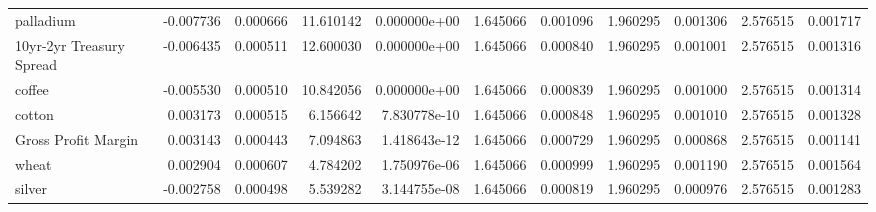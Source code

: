\documentclass[12pt,a4paper,english]{article}
\begin{document}
{{\begin{tabular}{@{}lrrrrrrrrrr@{}}
			palladium                     & -0.007736                & 0.000666                    & 11.610142                 & 0.000000e+00                             & 1.645066                      & 0.001096                      & 1.960295                     & 0.001306                     & 2.576515                     & 0.001717                     \\
			10yr-2yr Treasury Spread      & -0.006435                & 0.000511                    & 12.600030                 & 0.000000e+00                             & 1.645066                      & 0.000840                      & 1.960295                     & 0.001001                     & 2.576515                     & 0.001316                     \\
			coffee                        & -0.005530                & 0.000510                    & 10.842056                 & 0.000000e+00                             & 1.645066                      & 0.000839                      & 1.960295                     & 0.001000                     & 2.576515                     & 0.001314                     \\
			cotton                        & 0.003173                 & 0.000515                    & 6.156642                  & 7.830778e-10                             & 1.645066                      & 0.000848                      & 1.960295                     & 0.001010                     & 2.576515                     & 0.001328                     \\
			Gross Profit Margin           & 0.003143                 & 0.000443                    & 7.094863                  & 1.418643e-12                             & 1.645066                      & 0.000729                      & 1.960295                     & 0.000868                     & 2.576515                     & 0.001141                     \\
			wheat                         & 0.002904                 & 0.000607                    & 4.784202                  & 1.750976e-06                             & 1.645066                      & 0.000999                      & 1.960295                     & 0.001190                     & 2.576515                     & 0.001564                     \\
			silver                        & -0.002758                & 0.000498                    & 5.539282                  & 3.144755e-08                             & 1.645066                      & 0.000819                      & 1.960295                     & 0.000976                     & 2.576515                     & 0.001283                     \\

\end{tabular}}}
\end{document}
